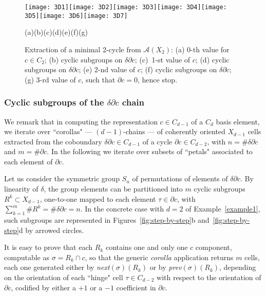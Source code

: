\begin{figure}[htbp] %
   \centering
\texttt{[image: 3D1]}\texttt{[image: 3D2]}\texttt{[image: 3D3]}\texttt{[image: 3D4]}\texttt{[image: 3D5]}\texttt{[image: 3D6]}\texttt{[image: 3D7]}

{\footnotesize\hspace{.06\textwidth}(a)\hfill(b)\hfill(c)\hfill(d)\hfill(e)\hfill(f)\hfill(g)\hspace{.06\textwidth}}
\vspace{-2mm}   
\caption{Extraction of a minimal 2-cycle from $\mathcal{A}(X_2)$: (a) 0-th value for $c\in C_2$; (b) cyclic subgroups on  $\delta\partial c$; (c)~1-st value of $c$; (d) cyclic subgroups on $\delta\partial c$; (e) 2-nd value of $c$; (f) cyclic subgroups on $\delta\partial c$; (g) 3-rd value of $c$, such that $\partial c=0$, hence stop.}
   \label{fig:3D}
\end{figure}



\subsubsection{Cyclic subgroups of the $\delta\partial c$ chain}
\label{sec:subgroups}

We remark that in computing the representation $c\in C_{d-1}$ of a $C_d$ basis element, we iterate over ``corollas" --- $(d-1)$-chains --- of coherently oriented $X_{d-1}$ cells extracted from the coboundary $\delta\partial c\in C_{d-1}$ of a cycle $\partial c\in C_{d-2}$, with $n=\#\delta\partial c$ and $m=\#\partial c$. In the following we   {iterate over subsets of ``petals"} associated to each element of $\partial c$.

Let us consider the symmetric group $S_n$ of permutations of elements of $\delta\partial c$. By linearity of $\delta$, the group elements can be partitioned into $m$ cyclic subgroups ${R^k}\subset X_{d-1}$, one-to-one mapped to each element $\tau\in\partial c$, with $\sum_{k=1}^m \#{R^k} = \#\delta\partial c = n$. {In the concrete case with $d=2$ of Example~\ref{example1}, such subgroups are represented in Figures~\ref{fig:step-by-step}b and~\ref{fig:step-by-step}d  by arrowed circles}. 

It is easy to prove that each $R_k$ contains one and only one $c$ component, computable as $\sigma=R_k\cap c$, so that the generic \emph{corolla} application returns $m$ cells, each one generated either by \emph{next}$(\sigma)(R_k)$ or by \emph{prev}$(\sigma)(R_k)$, depending on the orientation of each ``hinge" cell $\tau\in C_{d-2}$ with respect to the orientation of $\partial c$, codified by either a $+1$ or a $-1$ coefficient in $\partial c$. 

